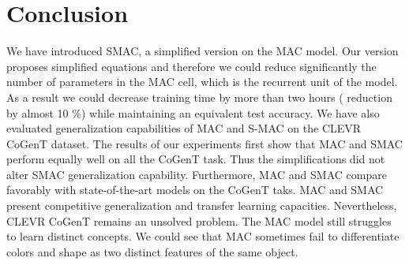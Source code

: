 \section{Conclusion}
We have introduced SMAC, a simplified version on the MAC model. Our version proposes simplified equations and therefore we could reduce significantly the number of parameters in the MAC cell, which is the recurrent unit of the model. As a result we could decrease training time by more than two hours ( reduction by almost 10 \%)
while maintaining an equivalent test accuracy. 
We have also evaluated generalization capabilities of MAC and S-MAC on the CLEVR CoGenT dataset.
The results of our experiments first show that MAC and SMAC perform equally well on all the CoGenT task. Thus the simplifications did not alter SMAC generalization capability.
Furthermore, MAC and SMAC compare favorably with state-of-the-art models on the CoGenT taks. MAC and SMAC present competitive generalization and transfer learning capacities.
Nevertheless, CLEVR CoGenT remains an unsolved problem. The MAC model still struggles to learn distinct concepts. We could see that MAC sometimes fail to differentiate colors and shape as two distinct features of the same object. 



